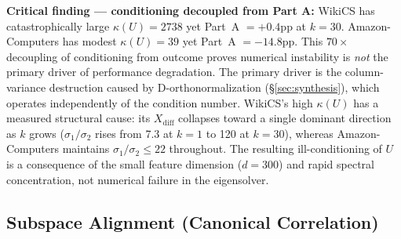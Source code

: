 \documentclass[11pt]{article}
\begin{document}
\noindent\textbf{Critical finding — conditioning decoupled from Part A:}
WikiCS has catastrophically large $\kappa(U){=}2738$ yet Part~A $= +0.4$pp at $k{=}30$.
Amazon-Computers has modest $\kappa(U){=}39$ yet Part~A $= -14.8$pp.  This $70\times$
decoupling of conditioning from outcome proves numerical instability is \emph{not} the
primary driver of performance degradation.  The primary driver is the column-variance
destruction caused by D-orthonormalization (§\ref{sec:synthesis}), which operates
independently of the condition number.
WikiCS's high $\kappa(U)$ has a measured structural cause: its $X_{\mathrm{diff}}$
collapses toward a single dominant direction as $k$ grows ($\sigma_1/\sigma_2$ rises
from 7.3 at $k{=}1$ to 120 at $k{=}30$), whereas Amazon-Computers maintains
$\sigma_1/\sigma_2 \leq 22$ throughout.  The resulting ill-conditioning of $U$ is a
consequence of the small feature dimension ($d{=}300$) and rapid spectral
concentration, not numerical failure in the eigensolver.

\subsection{Subspace Alignment (Canonical Correlation)}
\end{document}
